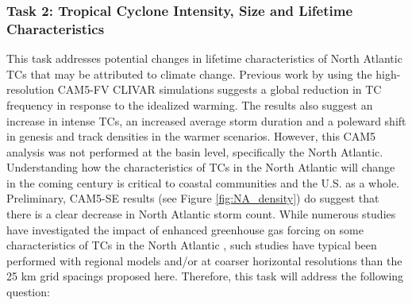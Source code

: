 \documentclass[11pt]{article}
\begin{document}




\subsubsection{Task 2: Tropical Cyclone Intensity, Size and Lifetime Characteristics}

This task addresses potential changes in lifetime characteristics of North Atlantic TCs that may be attributed to climate change. Previous work by \citet{Wehner2015} using the high-resolution CAM5-FV CLIVAR simulations suggests a global reduction in TC frequency in response to the idealized warming. The results also suggest an increase in intense TCs, an increased average storm duration and a poleward shift in genesis and track densities in the warmer scenarios. However, this CAM5 analysis was not performed at the basin level, specifically the North Atlantic. Understanding how the characteristics of TCs in the North Atlantic will change in the coming century is critical to coastal communities and the U.S. as a whole. Preliminary, CAM5-SE results (see Figure \ref{fig:NA_density}) do suggest that there is a clear decrease in North Atlantic storm count. While numerous studies have investigated the impact of enhanced greenhouse gas forcing on some characteristics of TCs in the North Atlantic \citep[e.g.,][]{Semmler2008,Knutson2008,Zhao2009,Knutson2013,Done2013,Diro2014}, such studies have typical been performed with regional models and/or at coarser horizontal resolutions than the 25 km grid spacings proposed here.  Therefore, this task will address the following question:
\end{document}
